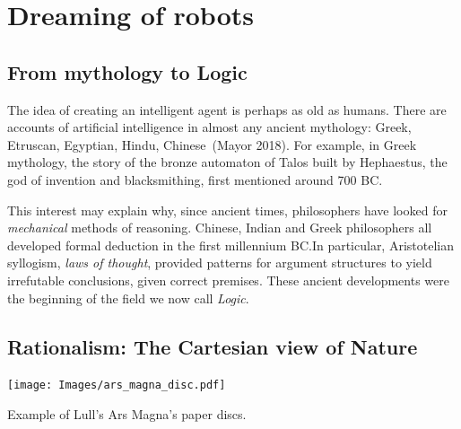 \documentclass[
  letterpaper,
  12pt,
  british]{tufte-book}
\theoremstyle{plain}
\theoremstyle{definition}
\theoremstyle{plain}
\theoremstyle{remark}
\begin{document}
\hypertarget{dreaming-of-robots}{%
\section{Dreaming of robots}\label{dreaming-of-robots}}

\hypertarget{from-mythology-to-logic}{%
\subsection{From mythology to Logic}\label{from-mythology-to-logic}}

The idea of creating an intelligent agent is perhaps as old as humans.
There are accounts of artificial intelligence in almost any ancient
mythology: Greek, Etruscan, Egyptian, Hindu, Chinese~(Mayor
2018).
For example, in Greek mythology, the story of the bronze automaton of
Talos built by Hephaestus, the god of invention and blacksmithing, first
mentioned around 700 BC.

This interest may explain why, since ancient times, philosophers have
looked for \emph{mechanical} methods of reasoning. Chinese, Indian and
Greek philosophers all developed formal deduction in the first
millennium BC.In particular, Aristotelian syllogism, \emph{laws of
thought}, provided patterns for argument structures to yield irrefutable
conclusions, given correct premises. These ancient developments were the
beginning of the field we now call \emph{Logic}.

\hypertarget{sec-rationalism}{%
\subsection{Rationalism: The Cartesian view of
Nature}\label{sec-rationalism}}

\begin{marginfigure}

{\centering \texttt{[image: Images/ars\_magna\_disc.pdf]}

}

\end{marginfigure}

Example of Lull's Ars Magna's paper discs.
\end{document}
